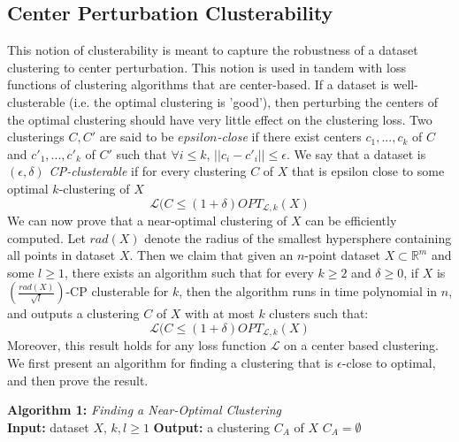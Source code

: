     \subsection*{Center Perturbation Clusterability}
    This notion of clusterability is meant to capture the robustness of a dataset clustering to center perturbation. This notion is used in tandem with loss functions of clustering algorithms that are center-based. If a dataset is well-clusterable (i.e. the optimal clustering is 'good'), then perturbing the centers of the optimal clustering should have very little effect on the clustering loss. Two clusterings $C,C'$ are said to be \textit{$epsilon$-close} if there exist centers $c_1,...,c_k$ of $C$ and $c'_1,...,c'_k$ of $C'$ such that $\forall i\leq k$, $||c_i-c'_i||\leq \epsilon$. We say that a dataset is \textit{$(\epsilon,\delta)$ CP-clusterable} if for every clustering $C$ of $X$ that is epsilon close to some optimal $k$-clustering of $X$
    $$\mathcal{L}(C \leq (1+\delta)OPT_{\mathcal{L},k}(X)$$
    We can now prove that a near-optimal clustering of $X$ can be efficiently computed. Let $rad(X)$ denote the radius of the smallest hypersphere containing all points in dataset $X$. Then we claim that given an $n$-point dataset $X\subset \mathbb{R}^m$ and some $l\geq 1$, there exists an algorithm such that for every $k\geq 2$ and $\delta \geq 0$, if $X$ is $(\frac{rad(X)}{\sqrt{l}})$-CP clusterable for $k$, then the algorithm runs in time polynomial in $n$, and outputs a clustering $C$ of $X$ with at most $k$ clusters such that:
    $$\mathcal{L}(C \leq (1+\delta)OPT_{\mathcal{L},k}(X)$$
    Moreover, this result holds for any loss function $\mathcal{L}$ on a center based clustering. We first present an algorithm for finding a clustering that is $\epsilon$-close to optimal, and then prove the result.
    
    \begin{algorithm}[H]
    \SetAlgoLined
    \textbf{Algorithm 1:} \textit{Finding a Near-Optimal Clustering}\\
    \textbf{Input:} dataset $X$, $k,l\geq1$\;
    \textbf{Output:} a clustering $C_A$ of $X$\;
    $C_A = \emptyset$\;
    \end{algorithm}
    
